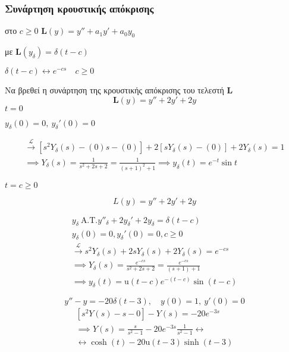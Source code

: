 \documentclass[11pt,a4paper,titlepage,final]{article}
\begin{document}
\subsubsection{Συνάρτηση κρουστικής απόκρισης}
στο \( c \geq 0 \) \( \boxed{\mathbf L(y) = y''+a_1y'+a_0y_0} \)

με \( \mathbf L(y_\delta) = \delta (t-c) \)

\( \delta(t-c) \leftrightarrow e^{-cs} \quad c \geq 0 \)

\begin{exercise*}{13.4}
	Να βρεθεί η συνάρτηση της κρουστικής απόκρισης του τελεστή \( \mathbf L \)
	\[
	\mathbf L (y) = y''+2y'+2y
	\]
	\( t=0 \)
		\tcblower

	\( y_\delta(0) = 0,\ y_\delta'(0) = 0 \)


	\begin{gather*}
	\xrightarrow{\mathscr L}
	\left[
	s^2Y_\delta(s) - (0)s-(0)
	\right] + 2 \left[sY_\delta(s)-(0) \right] +2Y_\delta(s) = 1
	\\ \implies Y_\delta(s) = \frac{1}{s^2+2s+2} = \frac{1}{(s+1)^2+1} \implies \boxed{y_\delta(t) = e^{-t}\sin t}
	\end{gather*}
\end{exercise*}

\begin{exercise*}{13.5}
	\( t = c\geq0 \)


	\[
	L(y) = y''+2y'+2y
	\]

	\begin{gather*}
	y_\delta \ \text{Α.Τ.} y''_\delta + 2y_\delta' + 2y_\delta = \delta(t-c)
	\\ y_\delta(0) = 0, y_\delta'(0) = 0, c \geq 0 \\
	\xrightarrow{\mathscr L}
	s^2Y_\delta(s)+2sY_\delta(s)+2Y_\delta(s) = e^{-cs}
	\\ \implies Y_\delta(s) = \frac{e^{-cs}}{s^2+2s+2} = \frac{e^{-cs}}{(s+1)+1}
	\\ \implies \boxed{
		y_\delta(t) = \mathrm u(t-c)e^{-(t-c)}\sin (t-c)
		}
	\end{gather*}
\end{exercise*}


\begin{exercise*}{13.6}
	\[
	y''-y=-20\delta(t-3), \quad y(0) = 1,\ y'(0) = 0
	\]
	\tcblower
	\begin{gather*}
	\left[s^2Y(s)-s-0\right]-Y(s)=-20e^{-3s} \\
	\implies Y(s) = \frac{s}{s^2-1}-20e^{-3s}\frac{1}{s^2-1} \leftrightarrow \\
	\leftrightarrow \cosh(t)-20\mathrm u(t-3)\sinh(t-3)
	\end{gather*}
\end{exercise*}
\end{document}
